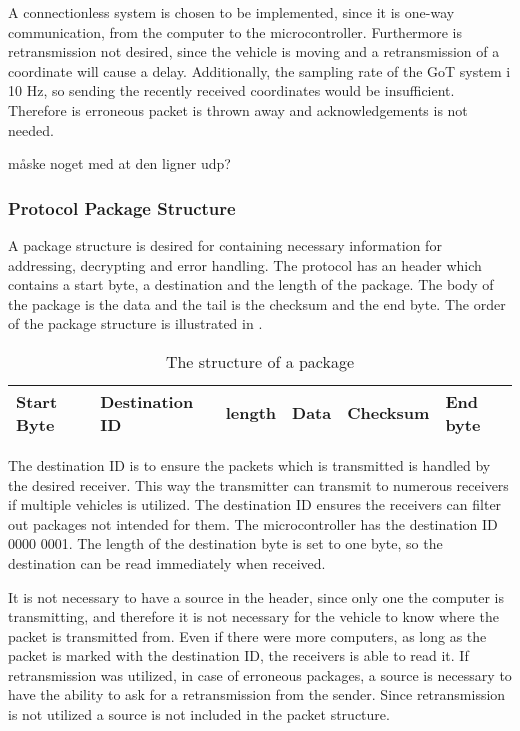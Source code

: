 A connectionless system is chosen to be implemented, since it is one-way communication, from the computer to the microcontroller. Furthermore is retransmission not desired, since the vehicle is moving and a retransmission of a coordinate will cause a delay. Additionally, the sampling rate of the GoT system i 10 \si{Hz}, so sending the recently received coordinates would be insufficient. Therefore is erroneous packet is thrown away and acknowledgements is not needed.

måske noget med at den ligner udp?

\subsubsection{Protocol Package Structure}
A package structure is desired for containing necessary information for addressing, decrypting and error handling. The protocol has an header which contains a start byte, a destination and the length of the package. The body of the package is the data and the tail is the checksum and the end byte. The order of the package structure is illustrated in .

\begin{table}[H]\centering
\begin{tabular}{|>{\centering\arraybackslash}m{2cm}|>{\centering\arraybackslash}m{2cm}|>{\centering\arraybackslash}m{2cm}|>{\centering\arraybackslash}m{2cm}|>{\centering\arraybackslash}m{2cm}|>{\centering\arraybackslash}m{2cm}|} \\
\hline
Start Byte & Destination ID & length & Data & Checksum & End byte \\
\hline
\end{tabular}
\caption{The structure of a package}
\label{CoorSetup}
\end{table}

The destination ID is to ensure the packets which is transmitted is handled by the desired receiver. This way the transmitter can transmit to numerous receivers if multiple vehicles is utilized. The destination ID ensures the receivers can filter out packages not intended for them. The microcontroller has the destination ID 0000 0001. The length of the destination byte is set to one byte, so the destination can be read immediately when received.

It is not necessary to have a source in the header, since only one the computer is transmitting, and therefore it is not necessary for the vehicle to know where the packet is transmitted from. Even if there were more computers, as long as the packet is marked with the destination ID, the receivers is able to read it. If retransmission was utilized, in case of erroneous packages, a source is necessary to have the ability to ask for a retransmission from the sender. Since retransmission is not utilized a source is not included in the packet structure.

